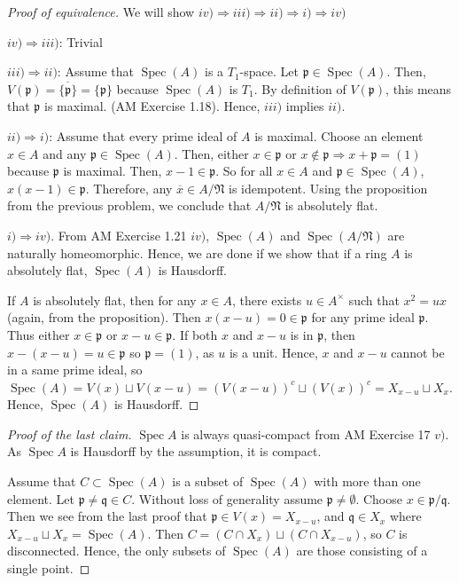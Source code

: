 \documentclass[12pt,letterpaper]{article}
\theoremstyle{definition}
\theoremstyle{remark}
\numberwithin{figure}{problem}
\numberwithin{equation}{section}
\DeclareMathOperator{\Spec}{Spec}
\begin{document}
\begin{proof}[Proof of equivalence]
 We will show $iv) \Rightarrow  iii) \Rightarrow ii) \Rightarrow i) \Rightarrow iv)$
 
 \par $iv) \Rightarrow iii)$: Trivial
 \par $iii) \Rightarrow ii)$: Assume that $\Spec(A)$ is a $T_1$-space. Let $\mathfrak{p} \in \Spec(A)$. Then, $V(\mathfrak{p}) = \overline{\{\mathfrak{p}\}} = \{\mathfrak{p}\}$ because $\Spec(A)$ is $T_1$. By definition of $V(\mathfrak{p})$, this means that $\mathfrak{p}$ is maximal. (AM Exercise 1.18). Hence, $iii)$ implies $ii)$. 
 \par $ii) \Rightarrow i)$: Assume that every prime ideal of $A$ is maximal. Choose an element $x \in A$ and any $\mathfrak{p} \in \Spec(A)$. Then, either $x \in \mathfrak{p}$ or $x \notin \mathfrak{p} \Rightarrow x+ \mathfrak{p} = (1)$ because $\mathfrak{p}$ is maximal. Then, $x -1 \in \mathfrak{p}$. So for all $x \in A$ and $\mathfrak{p} \in \Spec(A)$, $x(x-1) \in \mathfrak{p}$. Therefore, any $\overline{x} \in A/\mathfrak{N}$ is idempotent. Using the proposition from the previous problem, we conclude that $A/\mathfrak{N}$ is absolutely flat. 

 \par $i) \Rightarrow iv)$. From AM Exercise 1.21 $iv)$, $\Spec(A)$ and $\Spec(A/\mathfrak{N})$ are naturally homeomorphic. Hence, we are done if we show that if a ring $A$ is absolutely flat, $\Spec(A)$ is Hausdorff. 
 
 If $A$ is absolutely flat, then for any $x \in A$, there exists $u \in A^{\times}$ such that $x^2 = ux$ (again, from the proposition). Then $x(x-u) = 0 \in \mathfrak{p}$ for any prime ideal $\mathfrak{p}$. Thus either $x \in \mathfrak{p}$ or $x-u \in \mathfrak{p}$. If both $x$ and $x-u$ is in $\mathfrak{p}$, then $x-(x-u) = u \in \mathfrak{p}$ so $\mathfrak{p} = (1)$, as $u$ is a unit. Hence, $x$ and $x-u$ cannot be in a same prime ideal, so $\Spec(A) = V(x) \sqcup V(x-u) = (V(x-u))^c \sqcup (V(x))^c = X_{x-u} \sqcup X_x$. Hence, $\Spec(A)$ is Hausdorff.   
 
\end{proof}
\begin{proof}[Proof of the last claim]
  $\Spec A$ is always quasi-compact from AM Exercise 17 $v)$. As $\Spec A$ is Hausdorff by the assumption, it is compact. 
  \par Assume that $C \subset \Spec(A)$ is a subset of $\Spec(A)$ with more than one element. Let $\mathfrak{p} \neq \mathfrak{q} \in C$. Without loss of generality assume $\mathfrak{p} \neq \emptyset$. Choose $x \in \mathfrak{p}/\mathfrak{q}$. Then we see from the last proof that $\mathfrak{p} \in V(x) = X_{x-u}$, and $\mathfrak{q} \in X_{x}$ where $X_{x-u} \sqcup X_x = \Spec(A)$. Then $C = (C \cap X_x) \sqcup (C \cap X_{x-u})$, so $C$ is disconnected. Hence, the only subsets of $\Spec(A)$ are those consisting of a single point.  

\end{proof}
\end{document}
